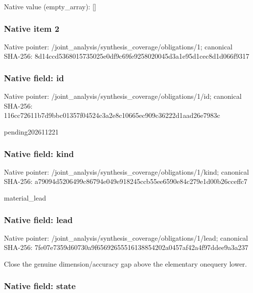 \documentclass[10pt,a4paper]{article}
\begin{document}
Native value (empty\_array): []



\subsubsection{Native item 2}


Native pointer: /joint\_analysis/synthesi\allowbreak{}s\_coverage/obligations/1; canonical SHA-256: 8d14ccd5368015735025e0df\allowbreak{}9c69fe9258020045d3a1e95d\allowbreak{}1cec8d1d066f9317



\subsubsection{Native field: id}


Native pointer: /joint\_analysis/synthesi\allowbreak{}s\_coverage/obligations/1\allowbreak{}/id; canonical SHA-256: 116cc72611b7d9bbc01357f0\allowbreak{}4524c3a2e8c10665ec909c36\allowbreak{}222d1aad26e7983c


pending202611221


\subsubsection{Native field: kind}


Native pointer: /joint\_analysis/synthesi\allowbreak{}s\_coverage/obligations/1\allowbreak{}/kind; canonical SHA-256: a79094d5206499c86794e049\allowbreak{}e918245ccb55ee6590e84c27\allowbreak{}9e1d00b26cceffc7


material\_lead


\subsubsection{Native field: lead}


Native pointer: /joint\_analysis/synthesi\allowbreak{}s\_coverage/obligations/1\allowbreak{}/lead; canonical SHA-256: 7fe07e7359d60730a9f65692\allowbreak{}655516138854202a0457af42\allowbreak{}a4f97ddee9a3a237


Close the genuine dimension/accuracy gap above the elementary onequery lower.


\subsubsection{Native field: state}
\end{document}
